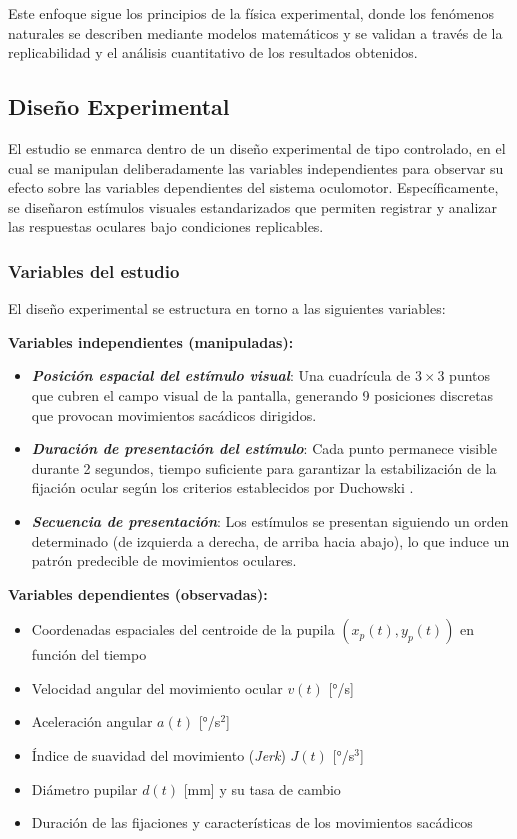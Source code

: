 Este enfoque sigue los principios de la física experimental, donde los fenómenos naturales se describen mediante modelos matemáticos y se validan a través de la replicabilidad y el análisis cuantitativo de los resultados obtenidos.

\subsection{Diseño Experimental}

El estudio se enmarca dentro de un diseño experimental de tipo controlado, en el cual se manipulan deliberadamente las variables independientes para observar su efecto sobre las variables dependientes del sistema oculomotor.
Específicamente, se diseñaron estímulos visuales estandarizados que permiten registrar y analizar las respuestas oculares bajo condiciones replicables.

\subsubsection{Variables del estudio}

El diseño experimental se estructura en torno a las siguientes variables:

\textbf{Variables independientes (manipuladas):}
\begin{itemize}
	\item\textbf{\textit{Posición espacial del estímulo visual}}: Una cuadrícula de $3 \times 3$ puntos que cubren el campo visual de la pantalla, generando 9 posiciones discretas que provocan movimientos sacádicos dirigidos.
	\item\textbf{\textit{Duración de presentación del estímulo}}: Cada punto permanece visible durante 2 segundos, tiempo suficiente para garantizar la estabilización de la fijación ocular según los criterios establecidos por Duchowski \cite{duchowski2017}.
	\item\textbf{\textit{Secuencia de presentación}}: Los estímulos se presentan siguiendo un orden determinado (de izquierda a derecha, de arriba hacia abajo), lo que induce un patrón predecible de movimientos oculares.
\end{itemize}

\textbf{Variables dependientes (observadas):}
\begin{itemize}
	\item Coordenadas espaciales del centroide de la pupila $(x_p(t), y_p(t))$ en función del tiempo
	\item Velocidad angular del movimiento ocular $v(t)$ [°/s]
	\item Aceleración angular $a(t)$ [°/s$^2$]
	\item Índice de suavidad del movimiento (\textit{Jerk}) $J(t)$ [°/s$^3$]
	\item Diámetro pupilar $d(t)$ [mm] y su tasa de cambio
	\item Duración de las fijaciones y características de los movimientos sacádicos
\end{itemize}

